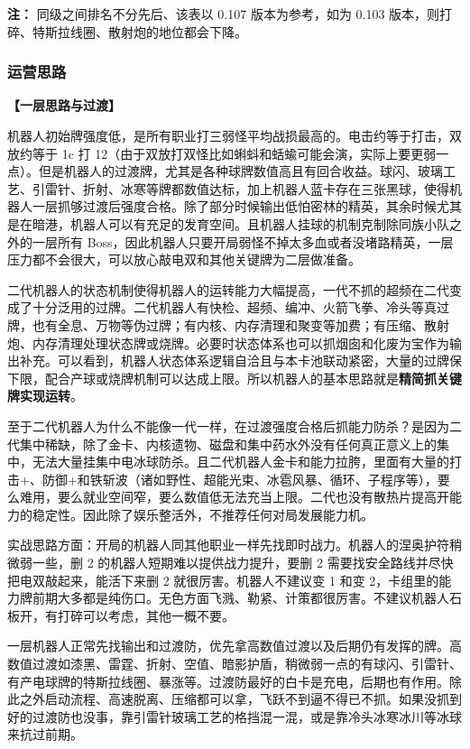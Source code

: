 \documentclass[12pt, a4paper]{article}
\begin{document}
\textbf{注：} 同级之间排名不分先后、该表以 0.107 版本为参考，如为 0.103 版本，则打碎、特斯拉线圈、散射炮的地位都会下降。

\subsubsection{运营思路}

\textbf{【一层思路与过渡】}

机器人初始牌强度低，是所有职业打三弱怪平均战损最高的。电击约等于打击，双放约等于 1c 打 12（由于双放打双怪比如蝌蚪和蛞蝓可能会演，实际上要更弱一点）。但是机器人的过渡牌，尤其是各种球牌数值高且有回合收益。球闪、玻璃工艺、引雷针、折射、冰寒等牌都数值达标，加上机器人蓝卡存在三张黑球，使得机器人一层抓够过渡后强度合格。除了部分时候输出低怕密林的精英，其余时候尤其是在暗港，机器人可以有充足的发育空间。且机器人挂球的机制克制除同族小队之外的一层所有 Boss，因此机器人只要开局弱怪不掉太多血或者没堵路精英，一层压力都不会很大，可以放心敲电双和其他关键牌为二层做准备。

二代机器人的状态机制使得机器人的运转能力大幅提高，一代不抓的超频在二代变成了十分泛用的过牌。二代机器人有快检、超频、编冲、火箭飞拳、冷头等真过牌，也有全息、万物等伪过牌；有内核、内存清理和聚变等加费；有压缩、散射炮、内存清理处理状态牌或烧牌。必要时状态体系也可以抓烟囱和化废为宝作为输出补充。可以看到，机器人状态体系逻辑自洽且与本卡池联动紧密，大量的过牌保下限，配合产球或烧牌机制可以达成上限。所以机器人的基本思路就是\textbf{精简抓关键牌实现运转}。

至于二代机器人为什么不能像一代一样，在过渡强度合格后抓能力防杀？是因为二代集中稀缺，除了金卡、内核遗物、磁盘和集中药水外没有任何真正意义上的集中，无法大量挂集中电冰球防杀。且二代机器人金卡和能力拉胯，里面有大量的打击+、防御+和铁斩波（诸如野性、超能光束、冰雹风暴、循环、子程序等），要么难用，要么就业空间窄，要么数值低无法充当上限。二代也没有散热片提高开能力的稳定性。因此除了娱乐整活外，不推荐任何对局发展能力机。

实战思路方面：开局的机器人同其他职业一样先找即时战力。机器人的涅奥护符稍微弱一些，删 2 的机器人短期难以提供战力提升，要删 2 需要找安全路线并尽快把电双敲起来，能活下来删 2 就很厉害。机器人不建议变 1 和变 2，卡组里的能力牌前期大多都是纯伤口。无色方面飞溅、勒紧、计策都很厉害。不建议机器人石板开，有打碎可以考虑，其他一概不要。

一层机器人正常先找输出和过渡防，优先拿高数值过渡以及后期仍有发挥的牌。高数值过渡如漆黑、雷霆、折射、空值、暗影护盾，稍微弱一点的有球闪、引雷针、有产电球牌的特斯拉线圈、暴涨等。过渡防最好的白卡是充电，后期也有作用。除此之外启动流程、高速脱离、压缩都可以拿，飞跃不到逼不得已不抓。如果没抓到好的过渡防也没事，靠引雷针玻璃工艺的格挡混一混，或是靠冷头冰寒冰川等冰球来抗过前期。
\end{document}
